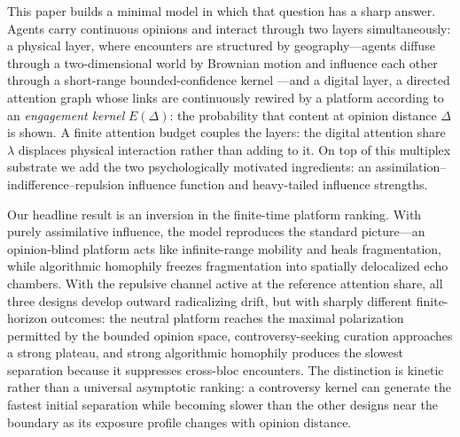 \documentclass[5p,times,twocolumn]{elsarticle}
\begin{document}
This paper builds a minimal model in which that question has a sharp
answer. Agents carry continuous opinions and interact through two layers
simultaneously: a physical layer, where encounters are structured by
geography---agents diffuse through a two-dimensional world by Brownian
motion and influence each other through a short-range bounded-confidence
kernel \citep{deffuant2000, hegselmann2002, alraddadi2024}---and a digital
layer, a directed attention graph whose links are continuously rewired by a
platform according to an \emph{engagement kernel} $E(\Delta)$: the
probability that content at opinion distance $\Delta$ is shown. A finite
attention budget couples the layers: the digital attention share $\lambda$
displaces physical interaction rather than adding to it. On top of this
multiplex substrate \citep{antonopoulos2018} we add the two
psychologically motivated ingredients: an
assimilation--indifference--repulsion influence function
\citep{jager2005, kurmyshev2011, tang2025} and heavy-tailed influence
strengths.

Our headline result is an inversion in the finite-time platform ranking.
With purely assimilative influence, the model reproduces the standard
picture---an opinion-blind platform acts like infinite-range mobility and
heals fragmentation, while algorithmic homophily freezes fragmentation
into spatially delocalized echo chambers. With the repulsive channel active
at the reference attention share, all three designs develop outward
radicalizing drift, but with sharply different finite-horizon outcomes: the
neutral platform reaches the maximal polarization permitted by the bounded
opinion space, controversy-seeking curation approaches a strong plateau,
and strong algorithmic homophily produces the slowest separation because
it suppresses cross-bloc encounters. The distinction is kinetic rather
than a universal asymptotic ranking: a controversy kernel can generate the
fastest initial separation while becoming slower than the other designs
near the boundary as its exposure profile changes with opinion distance.
\end{document}

